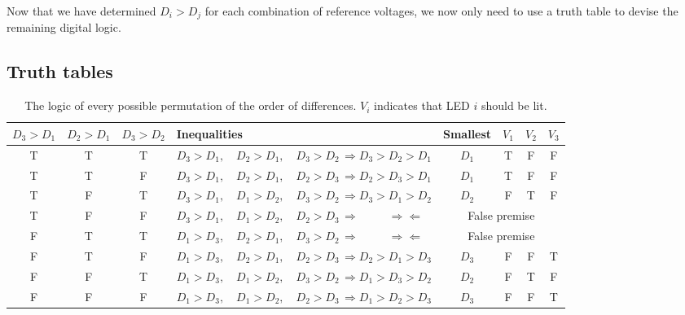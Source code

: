 \documentclass{article}
\begin{document}
Now that we have determined $D_i > D_j$ for each combination of reference voltages, we now only need to use a truth table to devise the remaining digital logic.
\subsection{Truth tables}
\begin{table}[H]
	\centering
	\caption{The logic of every possible permutation of the order of differences. $V_i$ indicates that LED $i$ should be lit.}
	\begin{tabular}{ccc|lc|ccc}
		$D_3 > D_1$ & $D_2 > D_1$ & $D_3 > D_2$ & Inequalities & Smallest & $V_1$ & $V_2$ & $V_3$ \\\hline
		T & T & T & $D_3 > D_1,\quad D_2 > D_1,\quad D_3 > D_2\, \Rightarrow D_3 > D_2 > D_1$ & $D_1$ & T & F & F \\
		T & T & F & $D_3 > D_1,\quad D_2 > D_1,\quad D_2 > D_3\, \Rightarrow D_2 > D_3 > D_1$ & $D_1$ & T & F & F \\
		T & F & T & $D_3 > D_1,\quad D_1 > D_2,\quad D_3 > D_2\, \Rightarrow D_3 > D_1 > D_2$ & $D_2$ & F & T & F \\
		T & F & F & $D_3 > D_1,\quad D_1 > D_2,\quad D_2 > D_3\, \Rightarrow\;\;\quad\quad \Rightarrow\!\Leftarrow$ &  \multicolumn{4}{c}{False premise} \\
		F & T & T & $D_1 > D_3,\quad D_2 > D_1,\quad D_3 > D_2\, \Rightarrow\;\;\quad\quad \Rightarrow\!\Leftarrow$ &  \multicolumn{4}{c}{False premise} \\
		F & T & F & $D_1 > D_3,\quad D_2 > D_1,\quad D_2 > D_3\, \Rightarrow D_2 > D_1 > D_3$ & $D_3$ & F & F & T \\
		F & F & T & $D_1 > D_3,\quad D_1 > D_2,\quad D_3 > D_2\, \Rightarrow D_1 > D_3 > D_2$ & $D_2$ & F & T & F \\
		F & F & F & $D_1 > D_3,\quad D_1 > D_2,\quad D_2 > D_3\, \Rightarrow D_1 > D_2 > D_3$ & $D_3$ & F & F & T \\
	\end{tabular}
\end{table}
\end{document}
